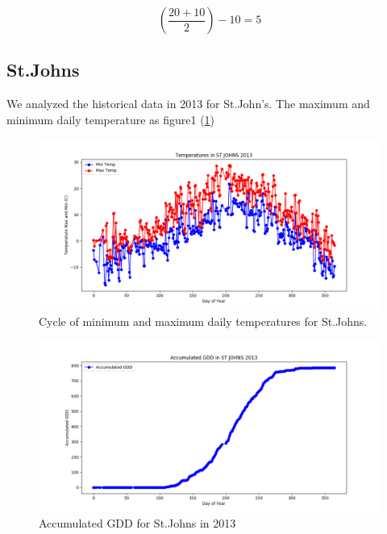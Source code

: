 \documentclass{article}
\begin{document}
\[ \left(\frac {20+10}{2}\right)-10=5 \] \par

\subsection{ \bf St.Johns }

We analyzed the historical data in 2013 for St.John's. The maximum and minimum daily temperature as figure1 (\ref{1})  




\begin{figure}[H]
\begin{center}
\includegraphics[width=5.25in]{Plot/St.Johns/day_vs_temp_2013.png}

\caption{Cycle of minimum and maximum daily temperatures for St.Johns.}
\label{1}
\end{center}





\end{figure}




\begin{figure}[H]
\centering
\includegraphics[width=5.25in]{Plot/stjohns.png}



\caption{Accumulated GDD for St.Johns in 2013}
\label{1.1}


\end{figure}
\end{document}
